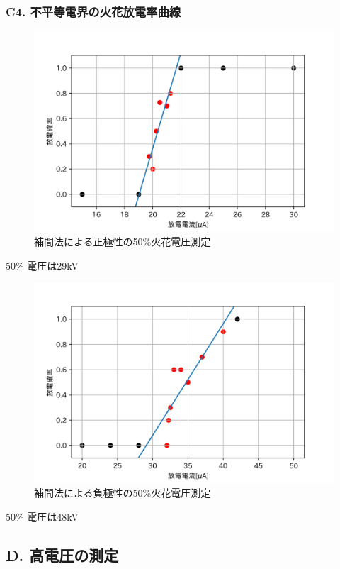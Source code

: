 \documentclass[dvipdfmx, twocolumn]{jsarticle}
\begin{document}
\subsubsection*{C4. 不平等電界の火花放電率曲線}
\begin{figure}[H]
\begin{center}
\includegraphics[scale = 0.5]{C41.png}
\caption{補間法による正極性の50\%火花電圧測定}
\end{center}
\end{figure}
50\% 電圧は29kV
\begin{figure}[H]
\begin{center}
\includegraphics[scale = 0.5]{C42.png}
\caption{補間法による負極性の50\%火花電圧測定}
\end{center}
\end{figure}
50\% 電圧は48kV
\subsection*{D. 高電圧の測定}
\end{document}
